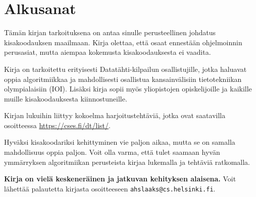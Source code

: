 \chapter*{Alkusanat}

Tämän kirjan tarkoituksena on antaa sinulle
perusteellinen johdatus kisakoodauksen maailmaan.
Kirja olettaa, että osaat ennestään
ohjelmoinnin perusasiat, mutta aiempaa kokemusta
kisakoodauksesta ei vaadita.

Kirja on tarkoitettu erityisesti
Datatähti-kilpailun osallistujille,
jotka haluavat oppia algoritmiikkaa
ja mahdollisesti osallistua kansainvälisiin
tietotekniikan olympialaisiin (IOI).
Lisäksi kirja sopii myös 
yliopistojen opiskelijoille ja
kaikille muille kisakoodauksesta kiinnostuneille.

Kirjan lukuihin liittyy kokoelma harjoitustehtäviä,
jotka ovat saatavilla osoitteessa \url{https://cses.fi/dt/list/}.

Hyväksi kisakoodariksi kehittyminen vie paljon aikaa,
mutta se on samalla mahdollisuus oppia paljon.
Voit olla varma, että tulet saamaan hyvän ymmärryksen
algoritmiikan perusteista
kirjaa lukemalla ja tehtäviä ratkomalla.

\textbf{Kirja on vielä keskeneräinen
ja jatkuvan kehityksen alaisena.}
Voit lähettää palautetta kirjasta
osoitteeseen
\texttt{ahslaaks@cs.helsinki.fi}.
